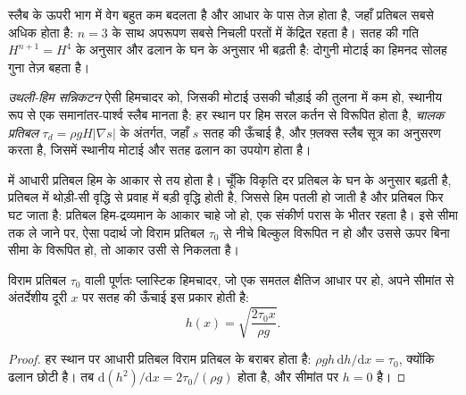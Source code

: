 स्लैब के ऊपरी भाग में वेग बहुत कम बदलता है और आधार के पास तेज़ होता है,
जहाँ प्रतिबल सबसे अधिक होता है: $n = 3$ के साथ अपरूपण
सबसे निचली परतों में केंद्रित रहता है। सतह की गति $H^{n+1} = H^4$ के अनुसार
और ढलान के घन के अनुसार भी बढ़ती है: दोगुनी मोटाई का हिमनद सोलह गुना तेज़ बहता है।

\begin{definition}\label{def:b3:glaciology:sia}
\emph{उथली-हिम सन्निकटन} ऐसी हिमचादर को, जिसकी मोटाई उसकी चौड़ाई की तुलना में कम हो,
स्थानीय रूप से एक समानांतर-पार्श्व स्लैब मानता है: हर स्थान पर हिम
सरल कर्तन से विरूपित होता है,
\emph{चालक प्रतिबल} $\tau_d = \rho gH|\nabla s|$ के अंतर्गत, जहाँ $s$ सतह की ऊँचाई है,
और फ़्लक्स स्लैब सूत्र का अनुसरण करता है, जिसमें
स्थानीय मोटाई और सतह ढलान का उपयोग होता है।
\end{definition}

 में आधारी प्रतिबल हिम के आकार से तय होता है।
चूँकि विकृति दर प्रतिबल के घन के अनुसार बढ़ती है, प्रतिबल में थोड़ी-सी वृद्धि से
प्रवाह में बड़ी वृद्धि होती है, जिससे हिम पतली हो जाती है और प्रतिबल फिर घट जाता है:
प्रतिबल हिम-द्रव्यमान के आकार चाहे जो हो, एक संकीर्ण परास के भीतर रहता है।
इसे सीमा तक ले जाने पर, ऐसा पदार्थ जो
विराम प्रतिबल $\tau_0$ से नीचे बिल्कुल विरूपित न हो और उससे ऊपर बिना सीमा के विरूपित हो,
तो आकार उसी से निकलता है।

\begin{proposition}[प्लास्टिक हिमचादर प्रोफ़ाइल]\label{prop:b3:glaciology:nye}
विराम प्रतिबल $\tau_0$ वाली पूर्णतः प्लास्टिक हिमचादर, जो एक समतल क्षैतिज आधार पर हो,
अपने सीमांत से अंतर्देशीय दूरी $x$ पर सतह की ऊँचाई इस प्रकार होती है:
\[
h(x) = \sqrt{\frac{2\tau_0x}{\rho g}} .
\]
\end{proposition}

\begin{proof}
हर स्थान पर आधारी प्रतिबल विराम प्रतिबल के बराबर होता है: $\rho gh\,\mathrm
dh/\mathrm dx = \tau_0$, क्योंकि ढलान छोटी है। तब $\mathrm d(h^2)/\mathrm
dx = 2\tau_0/(\rho g)$ होता है, और सीमांत पर $h = 0$ है।
\end{proof}

